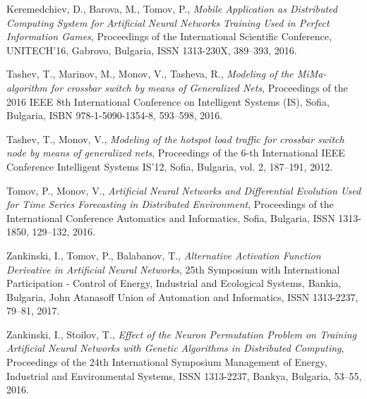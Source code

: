 \documentclass{llncs}
\begin{document}
\begin{thebibliography}{99}
 Keremedchiev, D., Barova, M., Tomov, P., \textit{Mobile Application as Distributed Computing System for Artificial Neural Networks Training Used in Perfect Information Games}, Proceedings of the International Scientific Conference, UNITECH’16, Gabrovo, Bulgaria, ISSN 1313-230X, 389--393, 2016.

 Tashev, T., Marinov, M., Monov, V., Tasheva, R., \textit{Modeling of the MiMa-algorithm for crossbar switch by means of Generalized Nets}, Proceedings of the 2016 IEEE 8th International Conference on Intelligent Systems (IS), Sofia, Bulgaria, ISBN 978-1-5090-1354-8, 593--598, 2016.

 Tashev, T., Monov, V., \textit{Modeling of the hotspot load traffic for crossbar switch node by means of generalized nets}, Proceedings of the 6-th International IEEE Conference Intelligent Systems IS'12, Sofia, Bulgaria, vol. 2, 187--191, 2012.

 Tomov, P., Monov, V., \textit{Artificial Neural Networks and Differential Evolution Used for Time Series Forecasting in Distributed Environment}, Proceedings of the International Conference Automatics and Informatics, Sofia, Bulgaria, ISSN 1313-1850, 129--132, 2016.

 Zankinski, I., Tomov, P., Balabanov, T., \textit{Alternative Activation Function Derivative in Artificial Neural Networks}, 25th Symposium with International Participation - Control of Energy, Industrial and Ecological Systems, Bankia, Bulgaria, John Atanasoff Union of Automation and Informatics, ISSN 1313-2237, 79--81, 2017.

 Zankinski, I., Stoilov, T., \textit{Effect of the Neuron Permutation Problem on Training Artificial Neural Networks with Genetic Algorithms in Distributed Computing}, Proceedings of the 24th International Symposium Management of Energy, Industrial and Environmental Systems, ISSN 1313-2237, Bankya, Bulgaria, 53--55, 2016.

\end{thebibliography}
\end{document}
